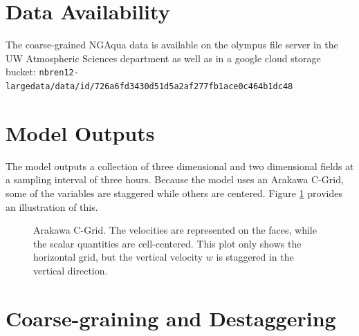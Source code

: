 \documentclass{report}
\newcommand{\1}[1]{\mathds{1}\left[#1\right]}
\begin{document}


\section{Data Availability}

The coarse-grained NGAqua data is available on the olympus file server in the UW Atmospheric Sciences department as well as in a google cloud storage bucket:
\verb|nbren12-largedata/data/id/726a6fd3430d51d5a2af277fb1ace0c464b1dc48|

\section{Model Outputs}

The model outputs a collection of three dimensional and two dimensional fields
at a sampling interval of three hours. 
Because the model uses an Arakawa C-Grid, some of the variables are staggered
while others are centered. 
Figure \ref{fig:arakawa-c-grid} provides an illustration of this.

\begin{figure}
  \centering


  \caption{Arakawa C-Grid. 
    The velocities are represented on the faces, while the scalar quantities are
    cell-centered. 
    This plot only shows the horizontal grid, but the vertical velocity $w$ is
    staggered in the vertical direction.}
  \label{fig:arakawa-c-grid}
\end{figure}


\section{Coarse-graining and Destaggering}
\label{sec:post-processing}
\end{document}
